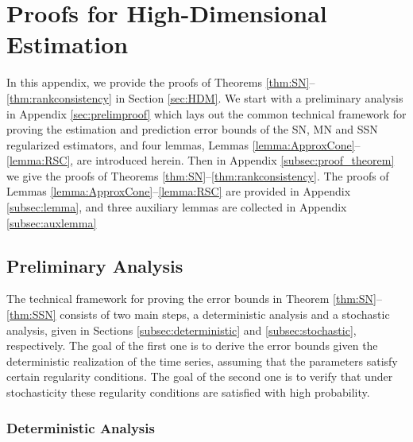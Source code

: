 \documentclass[12pt]{article}
\begin{document}
\renewcommand{\thesection}{Appendix B:}
\renewcommand{\thesubsection}{B.\arabic{subsection}}
\renewcommand{\theequation}{B.\arabic{equation}}
\renewcommand{\thelemma}{B.\arabic{lemma}}
\setcounter{equation}{0} 
\setcounter{lemma}{0}
\section{Proofs for High-Dimensional Estimation}

In this appendix, we provide the proofs of Theorems \ref{thm:SN}--\ref{thm:rankconsistency} in Section \ref{sec:HDM}. We start with a preliminary analysis in Appendix \ref{sec:prelimproof} which lays out the common technical framework for proving the estimation and prediction error bounds of the SN, MN and SSN regularized estimators,  and four lemmas, Lemmas \ref{lemma:ApproxCone}--\ref{lemma:RSC}, are introduced herein.
Then in Appendix \ref{subsec:proof_theorem} we give the proofs of Theorems \ref{thm:SN}--\ref{thm:rankconsistency}. The proofs of Lemmas \ref{lemma:ApproxCone}--\ref{lemma:RSC} are provided in Appendix \ref{subsec:lemma}, and three  auxiliary lemmas are collected  in Appendix \ref{subsec:auxlemma}


\subsection{Preliminary Analysis \label{sec:prelimproof}}
The technical framework for proving the error bounds in Theorem \ref{thm:SN}--\ref{thm:SSN} consists of two main steps, a deterministic analysis  and a stochastic analysis, given in Sections \ref{subsec:deterministic} and \ref{subsec:stochastic}, respectively. The goal of the first one is to derive the error bounds given the deterministic realization of the time series, assuming that the parameters satisfy certain regularity conditions. The goal of the second one is to verify that  under stochasticity these regularity conditions are satisfied with high probability.

\subsubsection{Deterministic Analysis \label{subsec:deterministic}}
\end{document}
